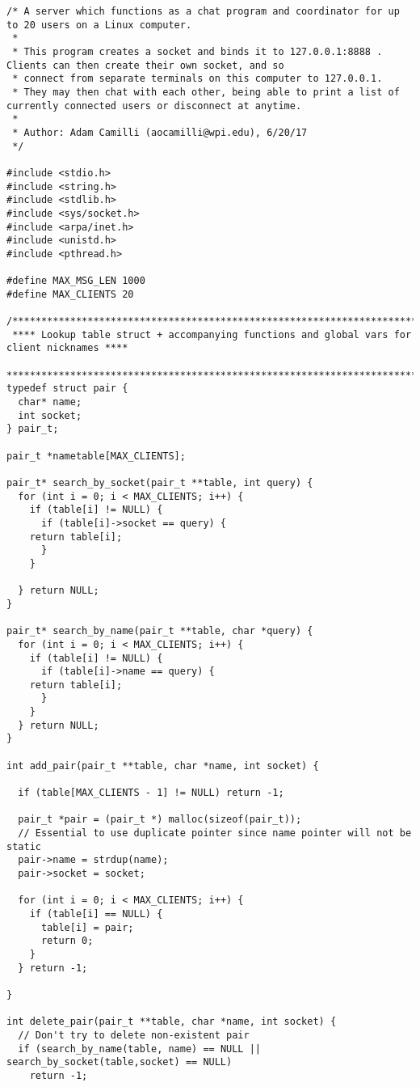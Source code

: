 \documentclass[titlepage, 14pt]{article}
\begin{document}
\begin{verbatim}
/* A server which functions as a chat program and coordinator for up to 20 users on a Linux computer.
 *
 * This program creates a socket and binds it to 127.0.0.1:8888 . Clients can then create their own socket, and so
 * connect from separate terminals on this computer to 127.0.0.1.
 * They may then chat with each other, being able to print a list of currently connected users or disconnect at anytime.
 *
 * Author: Adam Camilli (aocamilli@wpi.edu), 6/20/17
 */

#include <stdio.h>
#include <string.h>    
#include <stdlib.h>    
#include <sys/socket.h>
#include <arpa/inet.h> 
#include <unistd.h>    
#include <pthread.h> 

#define MAX_MSG_LEN 1000
#define MAX_CLIENTS 20

/*******************************************************************************************
 **** Lookup table struct + accompanying functions and global vars for client nicknames ****
 *******************************************************************************************/
typedef struct pair {
  char* name;
  int socket;
} pair_t;

pair_t *nametable[MAX_CLIENTS];

pair_t* search_by_socket(pair_t **table, int query) {
  for (int i = 0; i < MAX_CLIENTS; i++) {
    if (table[i] != NULL) {
      if (table[i]->socket == query) {
	return table[i];
      }
    }
    
  } return NULL;
}
  
pair_t* search_by_name(pair_t **table, char *query) {
  for (int i = 0; i < MAX_CLIENTS; i++) {
    if (table[i] != NULL) {
      if (table[i]->name == query) {
	return table[i];
      }
    }    
  } return NULL;
}

int add_pair(pair_t **table, char *name, int socket) {

  if (table[MAX_CLIENTS - 1] != NULL) return -1;
  
  pair_t *pair = (pair_t *) malloc(sizeof(pair_t));
  // Essential to use duplicate pointer since name pointer will not be static
  pair->name = strdup(name);
  pair->socket = socket;

  for (int i = 0; i < MAX_CLIENTS; i++) {
    if (table[i] == NULL) {
      table[i] = pair;
      return 0;
    }
  } return -1;
  
}

int delete_pair(pair_t **table, char *name, int socket) {
  // Don't try to delete non-existent pair
  if (search_by_name(table, name) == NULL || search_by_socket(table,socket) == NULL)
    return -1;


\end{verbatim}
\end{document}
